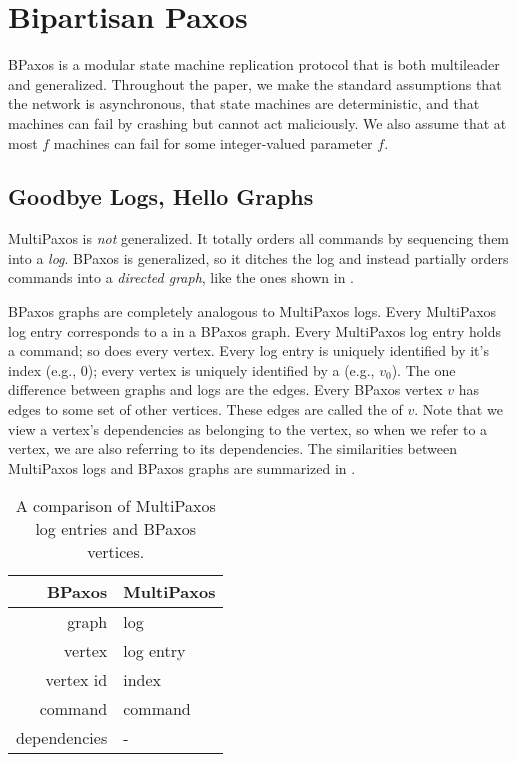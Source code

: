 \section{Bipartisan Paxos}
BPaxos is a modular state machine replication protocol that is both multileader
and generalized. Throughout the paper, we make the standard assumptions that
the network is asynchronous, that state machines are deterministic, and that
machines can fail by crashing but cannot act maliciously. We also assume that
at most $f$ machines can fail for some integer-valued parameter $f$.

\subsection{Goodbye Logs, Hello Graphs}
MultiPaxos is \emph{not} generalized. It totally orders all commands by
sequencing them into a \emph{log}. BPaxos is generalized, so it ditches the log
and instead partially orders commands into a \emph{directed graph}, like the
ones shown in .

BPaxos graphs are completely analogous to MultiPaxos logs. Every MultiPaxos log
entry corresponds to a  in a BPaxos graph. Every MultiPaxos log
entry holds a command; so does every vertex. Every log entry is uniquely
identified by it's index (e.g., \textcolor{flatred}{$0$}); every vertex is
uniquely identified by a  (e.g.,
\textcolor{flatred}{$v_0$}). The one difference between graphs and logs are the
edges. Every BPaxos vertex $v$ has edges to some set of other vertices. These
edges are called the  of $v$. Note that we view a
vertex's dependencies as belonging to the vertex, so when we refer to a vertex,
we are also referring to its dependencies. The similarities between MultiPaxos
logs and BPaxos graphs are summarized in .

\begin{table}[ht]
  \centering
  \caption{A comparison of MultiPaxos log entries and BPaxos vertices.}
  \begin{tabular}{r|l}
    \textbf{BPaxos} & \textbf{MultiPaxos} \\\hline
    graph           & log \\
    vertex          & log entry \\
    vertex id       & index \\
    command         & command \\
    dependencies    & - \\
  \end{tabular}
\end{table}


